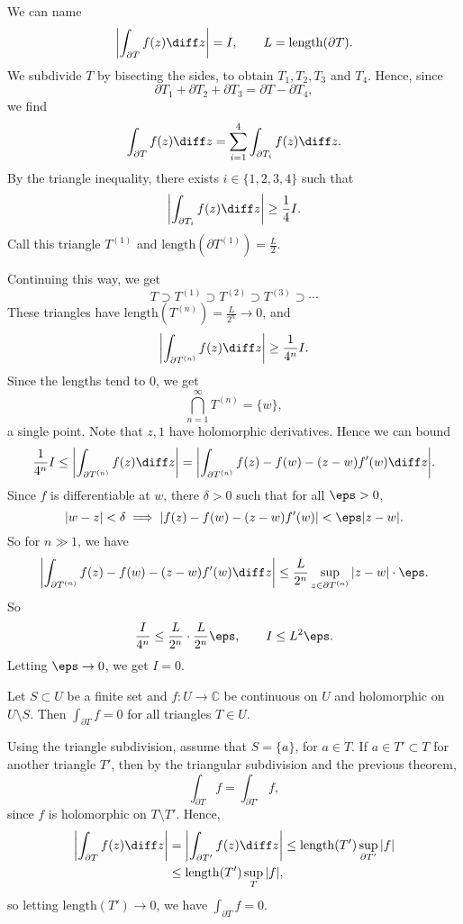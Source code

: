 \documentclass[12pt]{article}
\begin{document}
\begin{proofbox}
	We can name
	\[
		\biggl| \int_{\partial T}f(z) \diff z \biggr| = I, \qquad L = \mathrm{length}(\partial T)
	.\]
	We subdivide $T$ by bisecting the sides, to obtain $T_1, T_2, T_3$ and $T_4$. Hence, since
	\[
	\partial T_1 + \partial T_2 + \partial T_3 = \partial T - \partial T_4
	,\]
	we find
	\[
	\int_{\partial T}f(z) \diff z = \sum_{i = 1}^{4} \int_{\partial T_i} f(z) \diff z
	.\]
	By the triangle inequality, there exists $i \in \{1, 2, 3, 4\}$ such that 
	\[
	\biggl| \int_{\partial T_i} f(z) \diff z \biggr| \geq \frac{1}{4} I
	.\]
	Call this triangle $T^{(1)}$ and $\mathrm{length}(\partial T^{(1)}) = \frac{L}{2}$.

	Continuing this way, we get
	\[
		T \supset T^{(1)} \supset T^{(2)} \supset T^{(3)} \supset \cdots
	\]
	These triangles have $\mathrm{length}(T^{(n)}) = \frac{L}{2^{n}} \to 0$, and
	\[
	\biggl| \int_{\partial T^{(n)}} f(z) \diff z \biggr| \geq \frac{1}{4^{n}}I
	.\]
	Since the lengths tend to $0$, we get
	\[
		\bigcap_{n = 1}^{\infty}T^{(n)} = \{w\}
	,\]
	a single point. Note that $z, 1$ have holomorphic derivatives. Hence we can bound
	\[
	\frac{1}{4^{n}}I \leq \biggl| \int_{\partial T^{(n)}} f(z) \diff z \biggr| = \biggl| \int_{\partial T^{(n)}} f(z) - f(w) - (z - w)f'(w) \diff z \biggr|
	.\]
	Since $f$ is differentiable at $w$, there $\delta > 0$ such that for all $\eps > 0$,
	\[
	|w - z| < \delta \implies |f(z) - f(w) - (z - w)f'(w)| < \eps|z - w|
	.\]
	So for $n \gg 1$, we have
	\[
	\biggl| \int_{\partial T^{(n)}} f(z) - f(w) - (z-w)f'(w) \diff z \biggr| \leq \frac{L}{2^{n}} \sup_{z \in \partial T^{(n)}}|z - w| \cdot \eps
	.\]
	So
	\[
	\frac{I}{4^{n}} \leq \frac{L}{2^{n}} \cdot \frac{L}{2^{n}} \eps,\qquad I \leq L^2 \eps
	.\]
	Letting $\eps \to 0$, we get $I = 0$.
\end{proofbox}

\begin{theorem}
	Let $S \subset U$ be a finite set and $f : U \to \mathbb{C}$ be continuous on $U$ and holomorphic on $U \setminus S$. Then $\int_{\partial T} f = 0$ for all triangles $T \in U$.
\end{theorem}

\begin{proofbox}
	Using the triangle subdivision, assume that $S = \{a\}$, for $a \in T$. If $a \in T' \subset T$ for another triangle $T'$, then by the triangular subdivision and the previous theorem,
	\[
	\int_{\partial T} f = \int_{\partial T'} f
	,\]
	since $f$ is holomorphic on $T \setminus T'$. Hence,
	\begin{align*}
		\biggl| \int_{\partial T}f(z) \diff z \biggr| &= \biggl| \int_{\partial T'} f(z) \diff z \biggr| \leq \mathrm{length}(T') \sup_{\partial T'}|f| \\
							      &\leq \mathrm{length}(T') \sup_{T}|f|,
	\end{align*}
	so letting $\mathrm{length}(T') \to 0$, we have $\int_{\partial T} f = 0$.
\end{proofbox}
\end{document}
